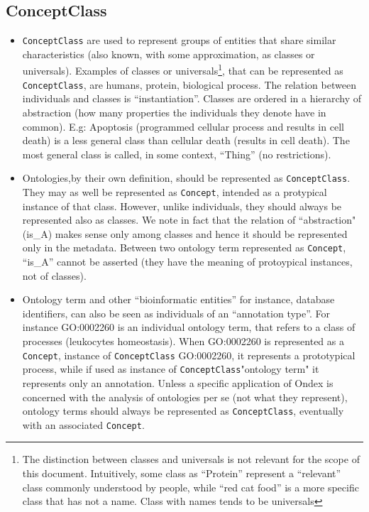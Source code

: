 \documentclass[a4paper,10pt]{article}
\newcommand{\term}[1]{\texttt{#1}\xspace}
\newcommand{\cc}{\term{ConceptClass}}
\newcommand{\co}{\term{Concept}}
\begin{document}
\subsection{ConceptClass}
\begin{itemize}
\item \cc are used to represent groups of entities that share similar characteristics (also known, with some approximation, as classes or universals). Examples of classes or universals\footnote{The distinction between classes and universals is not relevant for the scope of this document. Intuitively, some class as ``Protein'' represent a ``relevant'' class commonly understood by people, while ``red cat food'' is a more specific class that has not a name. Class with names tends to be universals}, that can be represented as \cc, are humans, protein, biological process.  The relation between individuals and classes is ``instantiation''.
Classes are ordered in a hierarchy of abstraction (how many properties the individuals they denote have in common). E.g: Apoptosis (programmed cellular process and results in cell death) is a less general class than cellular death (results in cell death). The most general class is called, in some context, ``Thing'' (no restrictions).
\item Ontologies,by their own definition, should be represented as \cc. They may as well be represented as \co, intended as a protypical instance of that class. However, unlike individuals, they should always be represented also as classes. We note in fact that the relation of ``abstraction" (is\_A) makes sense only among classes and hence it should be represented only in the metadata. Between two ontology term represented as \co, ``is\_A'' cannot be asserted (they have the meaning of protoypical instances, not of classes).
\item Ontology term and other ``bioinformatic entities'' for instance, database identifiers, can also be seen as individuals of an ``annotation type''.  For instance GO:0002260  is an individual ontology term, that refers to a class of processes (leukocytes homeostasis). 
When GO:0002260 is represented as a \co, instance of \cc GO:0002260, it represents a prototypical process, while if used as instance of \cc "ontology term" it represents only an annotation. Unless a specific application of Ondex is concerned with the analysis of ontologies per se (not what they represent), ontology terms should always be represented as \cc, eventually with an associated \co. 
\end{itemize}
\end{document}
